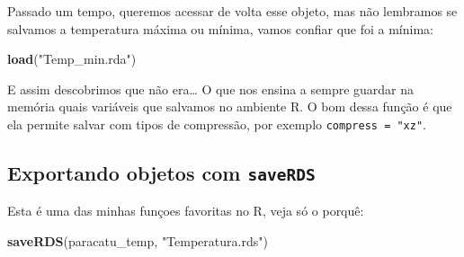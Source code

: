 \documentclass[]{book}
\newenvironment{Shaded}{\begin{snugshade}}{\end{snugshade}}
\newcommand{\KeywordTok}[1]{\textcolor[rgb]{0.13,0.29,0.53}{\textbf{#1}}}
\newcommand{\DataTypeTok}[1]{\textcolor[rgb]{0.13,0.29,0.53}{#1}}
\newcommand{\StringTok}[1]{\textcolor[rgb]{0.31,0.60,0.02}{#1}}
\newcommand{\CommentTok}[1]{\textcolor[rgb]{0.56,0.35,0.01}{\textit{#1}}}
\newcommand{\OperatorTok}[1]{\textcolor[rgb]{0.81,0.36,0.00}{\textbf{#1}}}
\newcommand{\NormalTok}[1]{#1}
\theoremstyle{definition}
\theoremstyle{definition}
\theoremstyle{definition}
\theoremstyle{remark}
\begin{document}
\begin{Shaded}
\end{Shaded}

Passado um tempo, queremos acessar de volta esse objeto, mas não
lembramos se salvamos a temperatura máxima ou mínima, vamos confiar que
foi a mínima:

\begin{Shaded}
\begin{Highlighting}[]
\KeywordTok{load}\NormalTok{(}\StringTok{"Temp_min.rda"}\NormalTok{)}
\end{Highlighting}
\end{Shaded}

E assim descobrimos que não era\ldots{} O que nos ensina a sempre
guardar na memória quais variáveis que salvamos no ambiente R. O bom
dessa função é que ela permite salvar com tipos de compressão, por
exemplo \texttt{compress\ =\ "xz"}.

\subsection{\texorpdfstring{Exportando objetos com
\texttt{saveRDS}}{Exportando objetos com saveRDS}}\label{exportando-objetos-com-saverds}

Esta é uma das minhas funçoes favoritas no R, veja só o porquê:

\begin{Shaded}
\begin{Highlighting}[]
\KeywordTok{saveRDS}\NormalTok{(paracatu_temp, }\StringTok{"Temperatura.rds"}\NormalTok{)}
\end{Highlighting}
\end{Shaded}
\end{document}
